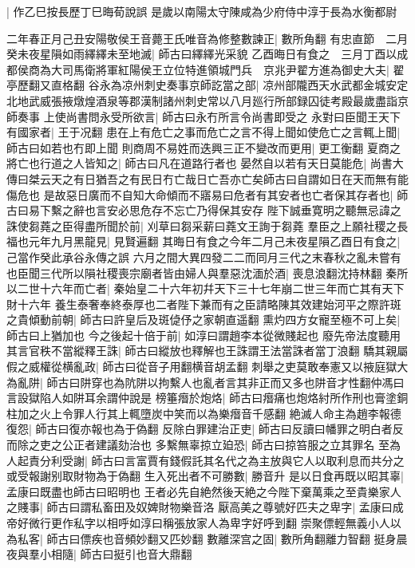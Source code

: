 |{
	作乙巳按長歷丁巳晦荀說誤}
是歲以南陽太守陳咸為少府侍中淳于長為水衡都尉

二年春正月己丑安陽敬侯王音薨王氏唯音為修整數諫正|{
	數所角翻}
有忠直節　二月癸未夜星隕如雨繹繹未至地滅|{
	師古曰繹繹光采貌}
乙酉晦日有食之　三月丁酉以成都侯商為大司馬衛將軍紅陽侯王立位特進領城門兵　京兆尹翟方進為御史大夫|{
	翟亭歷翻又直格翻}
谷永為凉州刺史奏事京師訖當之部|{
	凉州部隴西天水武都金城安定北地武威張掖燉煌酒泉等郡漢制諸州刺史常以八月廵行所部録囚徒考殿最歲盡詣京師奏事}
上使尚書問永受所欲言|{
	師古曰永冇所言令尚書即受之}
永對曰臣聞王天下有國家者|{
	王于况翻}
患在上有危亡之事而危亡之言不得上聞如使危亡之言輒上聞|{
	師古曰如若也冇即上聞}
則商周不易姓而迭興三正不變改而更用|{
	更工衡翻}
夏商之將亡也行道之人皆知之|{
	師古曰凡在道路行者也}
晏然自以若有天日莫能危|{
	尚書大傳曰桀云天之有日猶吾之有民日冇亡哉日亡吾亦亡矣師古曰自謂如日在天而無有能傷危也}
是故惡日廣而不自知大命傾而不寤易曰危者有其安者也亡者保其存者也|{
	師古曰易下繫之辭也言安必思危存不忘亡乃得保其安存}
陛下誠垂寛明之聽無忌諱之誅使芻蕘之臣得盡所聞於前|{
	刈草曰芻采薪曰蕘文王詢于芻蕘}
羣臣之上願社稷之長福也元年九月黑龍見|{
	見賢遍翻}
其晦日有食之今年二月己未夜星隕乙酉日有食之|{
	己當作癸此承谷永傳之誤}
六月之間大異四發二二而同月三代之末春秋之亂未嘗有也臣聞三代所以隕社稷喪宗廟者皆由婦人與羣惡沈湎於酒|{
	喪息浪翻沈持林翻}
秦所以二世十六年而亡者|{
	秦始皇二十六年初幷天下三十七年崩二世三年而亡其有天下財十六年}
養生泰奢奉終泰厚也二者陛下兼而有之臣請略陳其效建始河平之際許斑之貴傾動前朝|{
	師古曰許皇后及斑偼伃之家朝直遥翻}
熏灼四方女寵至極不可上矣|{
	師古曰上猶加也}
今之後起十倍于前|{
	如淳曰謂趙李本從微賤起也}
廢先帝法度聽用其言官秩不當縱釋王誅|{
	師古曰縱放也釋解也王誅謂王法當誅者當丁浪翻}
驕其親屬假之威權從横亂政|{
	師古曰從音子用翻横音胡孟翻}
刺舉之吏莫敢奉憲又以掖庭獄大為亂阱|{
	師古曰阱穿也為阬阱以拘繫人也亂者言其非正而又多也阱音才性翻仲馮曰言設獄陷人如阱耳余謂仲說是}
榜箠㿊於炮烙|{
	師古曰㿊痛也炮烙紂所作刑也膏塗銅柱加之火上令罪人行其上輒墮炭中笑而以為樂㿊音千感翻}
絶滅人命主為趙李報德復怨|{
	師古曰復亦報也為于偽翻}
反除白罪建治正吏|{
	師古曰反讀曰幡罪之明白者反而除之吏之公正者建議劾治也}
多繫無辜掠立廹恐|{
	師古曰掠笞服之立其罪名}
至為人起責分利受謝|{
	師古曰言富賈有錢假託其名代之為主放與它人以取利息而共分之或受報謝别取財物為于偽翻}
生入死出者不可勝數|{
	勝音升}
是以日食再既以昭其辜|{
	孟康曰既盡也師古曰昭明也}
王者必先自絶然後天絶之今陛下棄萬乘之至貴樂家人之賤事|{
	師古曰謂私畜田及奴婢財物樂音洛}
厭高美之尊號好匹夫之卑字|{
	孟康曰成帝好微行更作私字以相呼如淳曰稱張放家人為卑字好呼到翻}
崇聚僄輕無義小人以為私客|{
	師古曰僄疾也音頻妙翻又匹妙翻}
數離深宫之固|{
	數所角翻離力智翻}
挺身晨夜與羣小相隨|{
	師古曰挺引也音大鼎翻}
